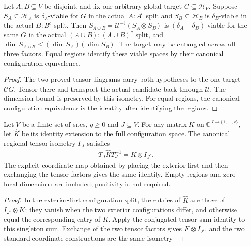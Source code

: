 \begin{lemma}
    \label{thm:actual_regional_viability_merge}
    \leanok
    Let $A,B\subseteq V$ be disjoint, and fix one arbitrary global target
    $G\subseteq\mathcal H_V$. Suppose $S_A\subseteq\mathcal H_A$ is
    $\delta_A$-viable for $G$ in the actual $A:A^c$ split and
    $S_B\subseteq\mathcal H_B$ is $\delta_B$-viable in the actual
    $B:B^c$ split. Then
    $S_{A\cup B}=\mathcal U^{-1}(S_A\otimes S_B)$ is
    $(\delta_A+\delta_B)$-viable for the same $G$ in the actual
    $(A\cup B):(A\cup B)^c$ split, and
    $\dim S_{A\cup B}\le(\dim S_A)(\dim S_B)$.
    The target may be entangled across all three factors.
    Equal regions identify these viable spaces by their canonical
    configuration equivalence.
\end{lemma}
\begin{proof}\leanok
    The two proved tensor diagrams carry both hypotheses to the one
    target $\mathcal CG$. Tensor there and transport the actual candidate
    back through $\mathcal U$. The dimension bound is preserved by this
    isometry. For equal regions, the canonical configuration equivalence
    is the identity after identifying the regions.
\end{proof}

\begin{lemma}
    \label{lem:regional_operator_tensor_coordinates}
    \leanok
    Let $V$ be a finite set of sites, $q\ge0$ and $J\subseteq V$.
    For any matrix $K$ on $\mathbb C^{J\to\{1,\ldots,q\}}$, let
    $\widehat K$ be its identity extension to the full configuration space.
    The canonical regional tensor isometry $T_J$ satisfies
    \begin{align}
       T_J\widehat K T_J^{-1}=K\otimes I_{J^c}.
    \end{align}
    The explicit coordinate map obtained by placing the exterior first
    and then exchanging the tensor factors gives the same identity.
    Empty regions and zero local dimensions are included; positivity
    is not required.
\end{lemma}
\begin{proof}\leanok
    In the exterior-first configuration split, the entries of
    $\widehat K$ are those of $I_{J^c}\otimes K$: they vanish when
    the two exterior configurations differ, and otherwise equal the
    corresponding entry of $K$. Apply the conjugated tensor-sum identity
    to this singleton sum. Exchange of the two tensor factors gives
    $K\otimes I_{J^c}$, and the two standard coordinate constructions
    are the same isometry.
\end{proof}
